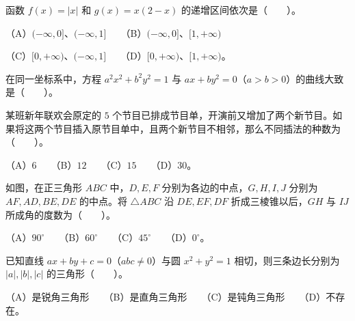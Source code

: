 \begin{question}
函数 $f(x)=|x|$ 和 $g(x)=x(2-x)$ 的递增区间依次是\mbox{（　　）}。

（A）$(-\infty,0]$、$(-\infty,1]$　　（B）$(-\infty,0]$、$[1,+\infty)$

（C）$[0,+\infty)$、$(-\infty,1]$　　（D）$[0,+\infty)$、$[1,+\infty)$。

\Needspace{0.4\textheight}
\end{question}
\begin{question}
在同一坐标系中，方程 $a^2x^2+b^2y^2=1$ 与 $ax+by^2=0$（$a>b>0$）的曲线大致是\mbox{（　　）}。
\nopagebreak[4]
\begin{center}\end{center}
\nopagebreak[4]
\end{question}
\begin{question}
某班新年联欢会原定的 $5$ 个节目已排成节目单，开演前又增加了两个新节目。如果将这两个节目插入原节目单中，且两个新节目不相邻，那么不同插法的种数为\mbox{（　　）}。

（A）$6$　　（B）$12$　　（C）$15$　　（D）$30$。

\Needspace{0.4\textheight}
\end{question}
\begin{question}
如图，在正三角形 $ABC$ 中，$D,E,F$ 分别为各边的中点，$G,H,I,J$ 分别为 $AF,AD,BE,DE$ 的中点。将 $\triangle ABC$ 沿 $DE,EF,DF$ 折成三棱锥以后，$GH$ 与 $IJ$ 所成角的度数为\mbox{（　　）}。
\nopagebreak[4]
\begin{center}\end{center}
\nopagebreak[4]
（A）$90^\circ$　　（B）$60^\circ$　　（C）$45^\circ$　　（D）$0^\circ$。

\end{question}
\begin{question}
已知直线 $ax+by+c=0$（$abc\ne0$）与圆 $x^2+y^2=1$ 相切，则三条边长分别为 $|a|,|b|,|c|$ 的三角形\mbox{（　　）}。

（A）是锐角三角形　　（B）是直角三角形　　（C）是钝角三角形　　（D）不存在。

\end{question}

